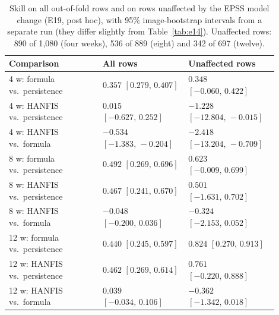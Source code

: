 \documentclass[pdflatex,sn-basic]{sn-jnl}
\theoremstyle{thmstyleone}%
\theoremstyle{thmstyletwo}%
\theoremstyle{thmstylethree}%
\begin{document}
\begin{table}[ht]
\caption{Skill on all out-of-fold rows and on rows unaffected by the EPSS model change (E19, post hoc), with 95\% image-bootstrap intervals from a separate run (they differ slightly from Table~\ref{tab:e14}). Unaffected rows: 890 of 1{,}080 (four weeks), 536 of 889 (eight) and 342 of 697 (twelve).}\label{tab:e19}
\footnotesize
\setlength{\tabcolsep}{3pt}
\begin{tabular}{@{}p{0.32\linewidth}p{0.29\linewidth}p{0.29\linewidth}@{}}
\hline
Comparison & All rows & Unaffected rows\\
\hline
4 w: formula vs.\ persistence & $0.357$ $[0.279,\,0.407]$ & $0.348$ $[-0.060,\,0.422]$\\
4 w: HANFIS vs.\ persistence & $0.015$ $[-0.627,\,0.252]$ & $-1.228$ $[-12.804,\,-0.015]$\\
4 w: HANFIS vs.\ formula & $-0.534$ $[-1.383,\,-0.204]$ & $-2.418$ $[-13.204,\,-0.709]$\\
8 w: formula vs.\ persistence & $0.492$ $[0.269,\,0.696]$ & $0.623$ $[-0.009,\,0.699]$\\
8 w: HANFIS vs.\ persistence & $0.467$ $[0.241,\,0.670]$ & $0.501$ $[-1.631,\,0.702]$\\
8 w: HANFIS vs.\ formula & $-0.048$ $[-0.200,\,0.036]$ & $-0.324$ $[-2.153,\,0.052]$\\
12 w: formula vs.\ persistence & $0.440$ $[0.245,\,0.597]$ & $0.824$ $[0.270,\,0.913]$\\
12 w: HANFIS vs.\ persistence & $0.462$ $[0.269,\,0.614]$ & $0.761$ $[-0.220,\,0.888]$\\
12 w: HANFIS vs.\ formula & $0.039$ $[-0.034,\,0.106]$ & $-0.362$ $[-1.342,\,0.018]$\\
\hline
\end{tabular}
\end{table}
\end{document}
